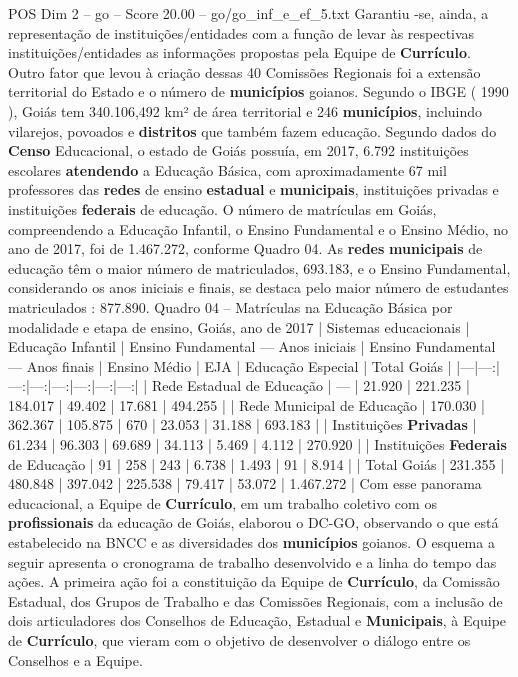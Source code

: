 \begin{textsample}{POS Dim 2 – go – Score 20.00 – go/go\_inf\_e\_ef\_5.txt}
Garantiu -se, ainda, a representação de instituições/entidades com a função de levar às respectivas instituições/entidades as informações propostas pela Equipe de \textbf{Currículo}.
Outro fator que levou à criação dessas 40 Comissões Regionais foi a extensão territorial do Estado e o número de \textbf{municípios} goianos.
Segundo o IBGE ( 1990 ), Goiás tem 340.106,492 km² de área territorial e 246 \textbf{municípios}, incluindo vilarejos, povoados e \textbf{distritos} que também fazem educação.
Segundo dados do \textbf{Censo} Educacional, o estado de Goiás possuía, em 2017, 6.792 instituições escolares \textbf{atendendo} a Educação Básica, com aproximadamente 67 mil professores das \textbf{redes} de ensino \textbf{estadual} e \textbf{municipais}, instituições privadas e instituições \textbf{federais} de educação.
O número de matrículas em Goiás, compreendendo a Educação Infantil, o Ensino Fundamental e o Ensino Médio, no ano de 2017, foi de 1.467.272, conforme Quadro 04.
As \textbf{redes} \textbf{municipais} de educação têm o maior número de matriculados, 693.183, e o Ensino Fundamental, considerando os anos iniciais e finais, se destaca pelo maior número de estudantes matriculados : 877.890.
Quadro 04 – Matrículas na Educação Básica por modalidade e etapa de ensino, Goiás, ano de 2017 | Sistemas educacionais | Educação Infantil | Ensino Fundamental — Anos iniciais | Ensino Fundamental — Anos finais | Ensino Médio | EJA | Educação Especial | Total Goiás | |---|---:|---:|---:|---:|---:|---:|---:| | Rede Estadual de Educação | — | 21.920 | 221.235 | 184.017 | 49.402 | 17.681 | 494.255 | | Rede Municipal de Educação | 170.030 | 362.367 | 105.875 | 670 | 23.053 | 31.188 | 693.183 | | Instituições \textbf{Privadas} | 61.234 | 96.303 | 69.689 | 34.113 | 5.469 | 4.112 | 270.920 | | Instituições \textbf{Federais} de Educação | 91 | 258 | 243 | 6.738 | 1.493 | 91 | 8.914 | | Total Goiás | 231.355 | 480.848 | 397.042 | 225.538 | 79.417 | 53.072 | 1.467.272 | Com esse panorama educacional, a Equipe de \textbf{Currículo}, em um trabalho coletivo com os \textbf{profissionais} da educação de Goiás, elaborou o DC-GO, observando o que está estabelecido na BNCC e as diversidades dos \textbf{municípios} goianos.
O esquema a seguir apresenta o cronograma de trabalho desenvolvido e a linha do tempo das ações.
A primeira ação foi a constituição da Equipe de \textbf{Currículo}, da Comissão Estadual, dos Grupos de Trabalho e das Comissões Regionais, com a inclusão de dois articuladores dos Conselhos de Educação, Estadual e \textbf{Municipais}, à Equipe de \textbf{Currículo}, que vieram com o objetivo de desenvolver o diálogo entre os Conselhos e a Equipe.

\end{textsample}

